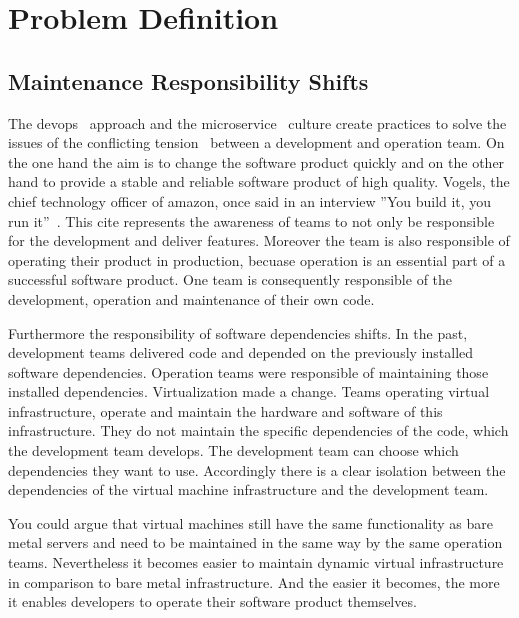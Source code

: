 \chapter{Problem Definition}
\label{chap:problem}

\section{Maintenance Responsibility Shifts}

The devops~\cite{devops_definition} approach and the
microservice~\cite{microservices_fowler} culture create practices to solve the issues of
the conflicting tension~\cite{sre_intro} between a development and operation team. On the
one hand the aim is to change the software product quickly and on the other hand to
provide a stable and reliable software product of high quality. Vogels, the chief
technology officer of amazon, once said in an interview ”You build it, you run
it”~\cite{build_run}. This cite represents the awareness of teams to not only be
responsible for the development and deliver features. Moreover the team is also
responsible of operating their product in production, becuase operation is an essential
part of a successful software product. One team is consequently responsible of the
development, operation and maintenance of their own code.

Furthermore the responsibility of software dependencies shifts. In the past, development
teams delivered code and depended on the previously installed software
dependencies. Operation teams were responsible of maintaining those installed
dependencies. Virtualization made a change. Teams operating virtual infrastructure,
operate and maintain the hardware and software of this infrastructure. They do not
maintain the specific dependencies of the code, which the development team develops. The
development team can choose which dependencies they want to use. Accordingly there is a
clear isolation between the dependencies of the virtual machine infrastructure and the
development team.

You could argue that virtual machines still have the same functionality as bare metal
servers and need to be maintained in the same way by the same operation
teams. Nevertheless it becomes easier to maintain dynamic virtual
infrastructure~\cite{infra_as_code_platforms} in comparison to bare metal
infrastructure. And the easier it becomes, the more it enables developers to operate their
software product themselves.

